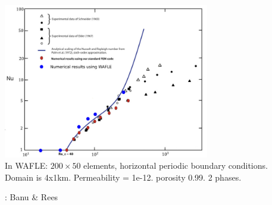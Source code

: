 \begin{center}
\includegraphics[width=9cm]{python_codes/fieldstone_107/images/NuRa2}\\
In WAFLE: $200 \times 50$ elements, horizontal periodic boundary conditions.\\ Domain is 4x1km. Permeability = 1e-12. porosity 0.99. 2 phases.  
\end{center}


\Literature: Banu \& Rees \cite{bare02}
